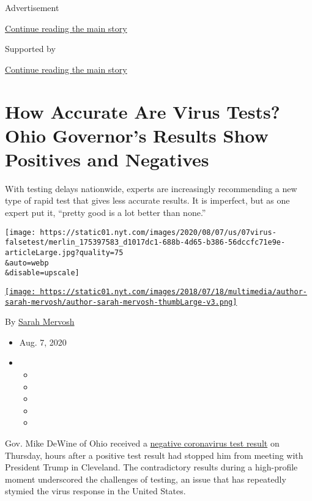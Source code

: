Advertisement

\protect\hyperlink{after-top}{Continue reading the main story}

Supported by

\protect\hyperlink{after-sponsor}{Continue reading the main story}

\hypertarget{how-accurate-are-virus-tests-ohio-governors-results-show-positives-and-negatives}{%
\section{How Accurate Are Virus Tests? Ohio Governor's Results Show
Positives and
Negatives}\label{how-accurate-are-virus-tests-ohio-governors-results-show-positives-and-negatives}}

With testing delays nationwide, experts are increasingly recommending a
new type of rapid test that gives less accurate results. It is
imperfect, but as one expert put it, ``pretty good is a lot better than
none.''

\texttt{[image: https://static01.nyt.com/images/2020/08/07/us/07virus-falsetest/merlin\_175397583\_d1017dc1-688b-4d65-b386-56dccfc71e9e-articleLarge.jpg?quality=75\\\&auto=webp\\\&disable=upscale]}

\href{https://www.nytimes.com/by/sarah-mervosh}{\texttt{[image: https://static01.nyt.com/images/2018/07/18/multimedia/author-sarah-mervosh/author-sarah-mervosh-thumbLarge-v3.png]}}

By \href{https://www.nytimes.com/by/sarah-mervosh}{Sarah Mervosh}

\begin{itemize}
\item
  Aug. 7, 2020
\item
  \begin{itemize}
  \item
  \item
  \item
  \item
  \item
  \end{itemize}
\end{itemize}

Gov. Mike DeWine of Ohio received a
\href{https://www.nytimes.com/2020/08/06/us/mike-dewine-coronavirus.html}{negative
coronavirus test result} on Thursday, hours after a positive test result
had stopped him from meeting with President Trump in Cleveland. The
contradictory results during a high-profile moment underscored the
challenges of testing, an issue that has repeatedly stymied the virus
response in the United States.


